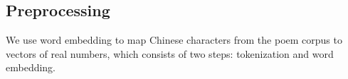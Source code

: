 %
 
\subsection{Preprocessing}
We use word embedding to map Chinese characters from the poem corpus to vectors of real numbers, which consists of two steps: tokenization and word embedding.
% 
%

